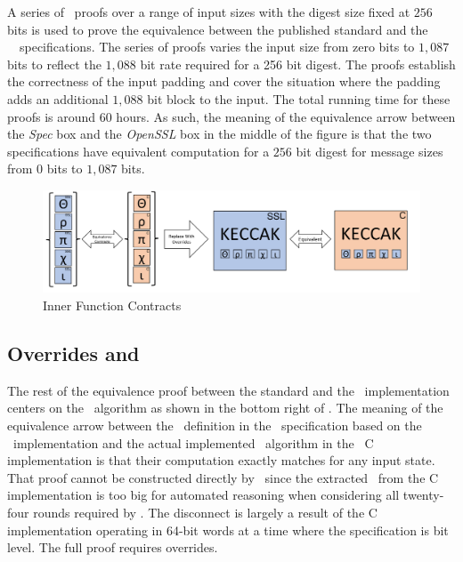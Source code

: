 A series of \saw\ proofs over a range of input sizes with the digest size fixed at $256$ bits is used to prove the equivalence between the published standard and the \openssl\ \cryptol\ specifications.
The series of proofs varies the input size from zero bits to $1,087$ bits to reflect the $1,088$ bit rate required for a 256 bit digest.
The proofs establish the correctness of the input padding and cover the situation where the padding adds an additional $1,088$ bit block to the input.
The total running time for these proofs is around 60 hours.
As such, the meaning of the equivalence arrow between the \emph{Spec} box and the \emph{OpenSSL} box in the middle of the figure is that the two specifications have equivalent computation for a $256$ bit digest for message sizes from $0$ bits to $1,087$ bits.

\begin{figure}[t]
  \centering
  \includegraphics[width=\linewidth]{figs/proof2.png}
  
  \caption{Inner Function Contracts}
  \label{fig:proofStructure2}
  
\end{figure}

\subsection{Overrides and \keccak}

The rest of the equivalence proof between the standard and the \openssl\ implementation centers on the \keccak\ algorithm as shown in the bottom right of .
The meaning of the equivalence arrow between the \keccak\ definition in the \cryptol\ specification based on the \openssl\ implementation and the actual implemented \keccak\ algorithm in the \openssl\ C implementation is that their computation exactly matches for any input state.
That proof cannot be constructed directly by \saw\ since the extracted \sawcore\ from the C implementation is too big for automated reasoning when considering all twenty-four rounds required by \keccak.
The disconnect is largely a result of the C implementation operating in 64-bit words at a time where the specification is bit level.
The full proof requires overrides.

